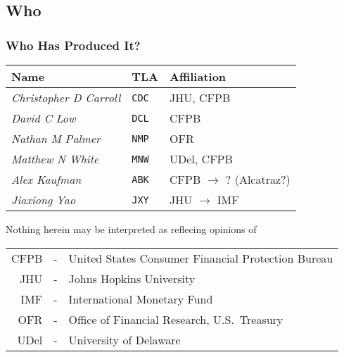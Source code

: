 \documentclass[public]{beamer}
\providecommand{\CDC}{\texttt{CDC}} %
\providecommand{\NMP}{\texttt{NMP}} %
\providecommand{\MNW}{\texttt{MNW}} %
\providecommand{\DCL}{\texttt{DCL}} %
\providecommand{\ABK}{\texttt{ABK}} %
\begin{document}
\subsection{Who}
\begin{frame}
\frametitle{Who Has Produced It?}

\begin{footnotesize}
\begin{center}

\begin{tabular}{lll}
Name & TLA & Affiliation %
\\ \hline \hline {\it Christopher D Carroll} & \texttt{{\CDC}} & JHU, CFPB %
\\ {\it David C Low} & \texttt{{\DCL}} & CFPB %
\\ {\it Nathan M Palmer} & \texttt{{\NMP}} & OFR %
\\ {\it Matthew N White} & \texttt{{\MNW}} & UDel, CFPB %
\\ \hline {\it Alex Kaufman} & \texttt{{\ABK}} & CFPB $\rightarrow$ ? (Alcatraz?)  %
\\ {\it Jiaxiong Yao} & \texttt{JXY} & JHU $\rightarrow$ IMF  %
\end{tabular}
\end{center}


Nothing herein may be interpreted as reflecing opinions of 
\begin{center}
\begin{tabular}{rcl}
 CFPB & - & United States Consumer Financial Protection Bureau
\\ JHU & - & Johns Hopkins University
\\ IMF & - & International Monetary Fund
\\ OFR & - & Office of Financial Research, U.S.\ Treasury
\\ UDel & - & University of Delaware
\end{tabular}

\end{center}


\end{footnotesize}
\end{frame}
\end{document}
